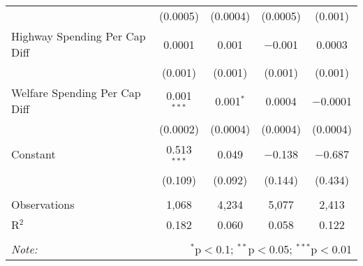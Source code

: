 \begin{table}[!htbp]
\begin{tabular}{@{\extracolsep{5pt}}lcccc}
  & (0.0005) & (0.0004) & (0.0005) & (0.001) \\ 
  Highway Spending Per Cap Diff & 0.0001 & 0.001 & $-$0.001 & 0.0003 \\ 
  & (0.001) & (0.001) & (0.001) & (0.001) \\ 
  Welfare Spending Per Cap Diff & 0.001$^{***}$ & 0.001$^{*}$ & 0.0004 & $-$0.0001 \\ 
  & (0.0002) & (0.0004) & (0.0004) & (0.0004) \\ 
  Constant & 0.513$^{***}$ & 0.049 & $-$0.138 & $-$0.687 \\ 
  & (0.109) & (0.092) & (0.144) & (0.434) \\ 
 \hline \\[-1.8ex] 
Observations & 1,068 & 4,234 & 5,077 & 2,413 \\ 
R$^{2}$ & 0.182 & 0.060 & 0.058 & 0.122 \\ 
\hline 
\hline \\[-1.8ex] 
\textit{Note:}  & \multicolumn{4}{r}{$^{*}$p$<$0.1; $^{**}$p$<$0.05; $^{***}$p$<$0.01} \\ 
\end{tabular} 
\end{table} 
